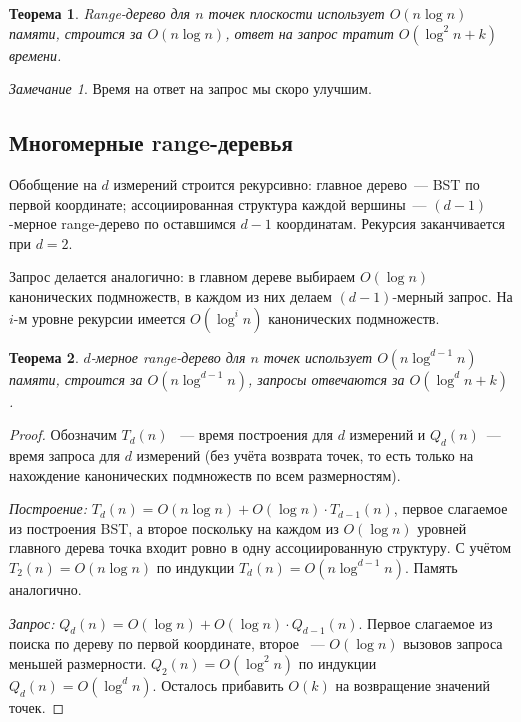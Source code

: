 \documentclass[12pt, a4paper]{article}
\theoremstyle{definition}
\theoremstyle{plain}
\newtheorem*{theorem}{Теорема}
\theoremstyle{remark}
\newtheorem*{remark}{Замечание}
\begin{document}
\begin{theorem}
Range-дерево для $n$ точек плоскости использует $O(n\log n)$ памяти, строится за $O(n\log n)$, ответ на запрос тратит $O(\log^2 n + k)$ времени.
\end{theorem}

\begin{remark}
    Время на ответ на запрос мы скоро улучшим.
\end{remark}

\subsection{Многомерные range-деревья}

Обобщение на $d$ измерений строится рекурсивно: главное дерево~--- BST по первой координате; ассоциированная структура каждой вершины~--- $(d-1)$-мерное range-дерево по оставшимся $d-1$ координатам. Рекурсия заканчивается при $d=2$.

Запрос делается аналогично: в главном дереве выбираем $O(\log n)$ канонических подмножеств, в каждом из них делаем $(d-1)$-мерный запрос. На $i$-м уровне рекурсии имеется $O(\log^i n)$ канонических подмножеств.

\begin{theorem}
$d$-мерное range-дерево для $n$ точек использует $O(n\log^{d-1} n)$ памяти, строится за $O(n\log^{d-1} n)$, запросы отвечаются за $O(\log^d n + k)$.
\end{theorem}

\begin{proof}
Обозначим $T_d(n)$ ~--- время построения для $d$ измерений и $Q_d(n)$~--- время запроса для $d$ измерений (без учёта возврата точек, то есть только на нахождение канонических подмножеств по всем размерностям).

\textit{Построение:} $T_d(n) = O(n\log n) + O(\log n) \cdot T_{d-1}(n)$, первое слагаемое из построения BST, а второе поскольку на каждом из $O(\log n)$ уровней главного дерева точка входит ровно в одну ассоциированную структуру. С учётом $T_2(n) = O(n\log n)$ по индукции $T_d(n) = O(n\log^{d-1} n)$. Память аналогично.

\textit{Запрос:} $Q_d(n) = O(\log n) + O(\log n) \cdot Q_{d-1}(n)$. Первое слагаемое из поиска по дереву по первой координате, второе ~--- $O(\log n)$ вызовов запроса меньшей размерности. $Q_2(n) = O(\log^2 n)$ по индукции $Q_d(n) = O(\log^d n)$. Осталось прибавить $O(k)$ на возвращение значений точек.
\end{proof}
\end{document}
